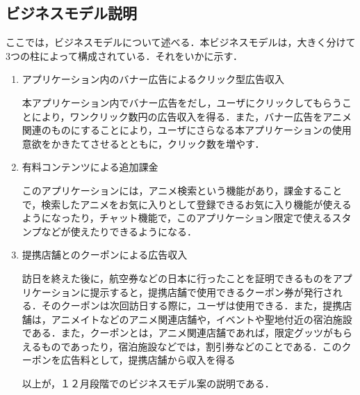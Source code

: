 \subsection{ビジネスモデル説明}
\par
 ここでは，ビジネスモデルについて述べる．本ビジネスモデルは，大きく分けて3つの柱によって構成されている．それをいかに示す．
\begin{enumerate}
\item アプリケーション内のバナー広告によるクリック型広告収入
\par 
本アプリケーション内でバナー広告をだし，ユーザにクリックしてもらうことにより，ワンクリック数円の広告収入を得る．また，バナー広告をアニメ関連のものにすることにより，ユーザにさらなる本アプリケーションの使用意欲をかきたてさせるとともに，クリック数を増やす．
\item 有料コンテンツによる追加課金 
\par
 このアプリケーションには，アニメ検索という機能があり，課金することで，検索したアニメをお気に入りとして登録できるお気に入り機能が使えるようになったり，チャット機能で，このアプリケーション限定で使えるスタンプなどが使えたりできるようになる．
\item 提携店舗とのクーポンによる広告収入
\par
 訪日を終えた後に，航空券などの日本に行ったことを証明できるものをアプリケーションに提示すると，提携店舗で使用できるクーポン券が発行される．そのクーポンは次回訪日する際に，ユーザは使用できる．また，提携店舗は，アニメイトなどのアニメ関連店舗や，イベントや聖地付近の宿泊施設である．また，クーポンとは，アニメ関連店舗であれば，限定グッツがもらえるものであったり，宿泊施設などでは，割引券などのことである．このクーポンを広告料として，提携店舗から収入を得る
\par
以上が，１２月段階でのビジネスモデル案の説明である．
\end{enumerate}
